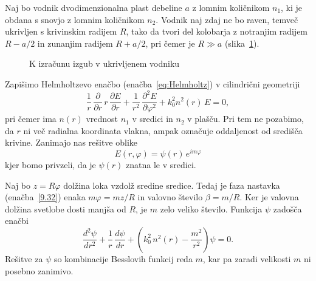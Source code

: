 Naj bo vodnik dvodimenzionalna plast debeline $a$ z lomnim količnikom
$n_{1}$, ki je obdana s snovjo z lomnim količnikom $n_{2}$. Vodnik naj
zdaj ne bo raven, temveč ukrivljen s krivinskim radijem $R$, tako da tvori 
del kolobarja z notranjim radijem $R-a/2$ in zunanjim radijem $R+a/2$, pri 
čemer je $R\gg a$ (slika~\ref{fig:bend}). 
\begin{figure}[h]
\centering
\def\svgwidth{60truemm} 
 
\caption{K izračunu izgub v ukrivljenem vodniku}
\label{fig:bend}
\end{figure}

Zapišimo Helmholtzevo enačbo (enačba~\ref{eq:Helmholtz}) v cilindrični 
geometriji
\begin{equation}
\frac{1}{r}\,\frac{\partial}{\partial r}\, r\,\frac{\partial E}{\partial r}
+\frac{1}{r^{2}}\,\frac{\partial^{2}E}{\partial\varphi^{2}}+k_{0}^{2}n^{2}\left(r\right)\, E=0,
\label{9.31}
\end{equation}
pri čemer ima $n\left(r\right)$ vrednost $n_{1}$ v sredici in $n_{2}$ v plašču. 
Pri tem ne pozabimo, da $r$ ni več radialna koordinata vlakna, ampak
označuje oddaljenost od središča krivine. Zanimajo nas rešitve oblike 
\begin{equation}
E(r, \varphi) =\psi\left(r\right)\, e^{im\varphi}
\label{9.32}
\end{equation}
kjer bomo privzeli, da je $\psi\left(r\right)$ znatna le v sredici. 

Naj bo $z=R\varphi$ dolžina loka vzdolž sredine sredice. Tedaj je faza nastavka
(enačba~\ref{9.32}) enaka $m\varphi = m z/R$ in valovno število $\beta = m/R$.
Ker je valovna dolžina svetlobe dosti manjša od $R$, je $m$ zelo veliko število. 
Funkcija $\psi$ zadošča enačbi 
\begin{equation}
\frac{d^{2}\psi}{dr^{2}}+\frac{1}{r}\,\frac{d\psi}{dr}+\left(k_{0}^{2}\, 
n^{2}\left(r\right)-\frac{m^{2}}{r^{2}}\right)\psi=0.
\label{9.33}
\end{equation}
Rešitve za $\psi$ so kombinacije Besslovih funkcij reda $m$, kar
pa zaradi velikosti $m$ ni posebno zanimivo. 

